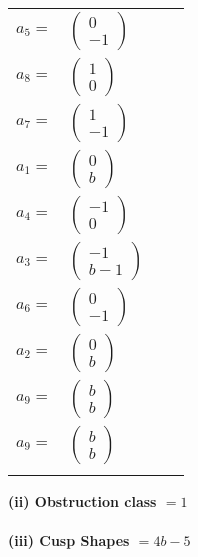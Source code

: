 \documentclass[1p]{elsarticle_modified}
\theoremstyle{definition}
\begin{document}
\begin{tabular}{m{7pt} m{180pt} m{7pt} m{180pt} }
\flushright $a_{5}=$&$\begin{pmatrix}0\\-1\end{pmatrix}$ \\
\flushright $a_{8}=$&$\begin{pmatrix}1\\0\end{pmatrix}$ \\
\flushright $a_{7}=$&$\begin{pmatrix}1\\-1\end{pmatrix}$ \\
\flushright $a_{1}=$&$\begin{pmatrix}0\\b\end{pmatrix}$ \\
\flushright $a_{4}=$&$\begin{pmatrix}-1\\0\end{pmatrix}$ \\
\flushright $a_{3}=$&$\begin{pmatrix}-1\\b-1\end{pmatrix}$ \\
\flushright $a_{6}=$&$\begin{pmatrix}0\\-1\end{pmatrix}$ \\
\flushright $a_{2}=$&$\begin{pmatrix}0\\b\end{pmatrix}$ \\
\flushright $a_{9}=$&$\begin{pmatrix}b\\b\end{pmatrix}$\\ \flushright $a_{9}=$&$\begin{pmatrix}b\\b\end{pmatrix}$\\&\end{tabular}
\flushleft \textbf{(ii) Obstruction class $= 1$}\\~\\
\flushleft \textbf{(iii) Cusp Shapes $= 4 b-5$}\\~\\
\end{document}
